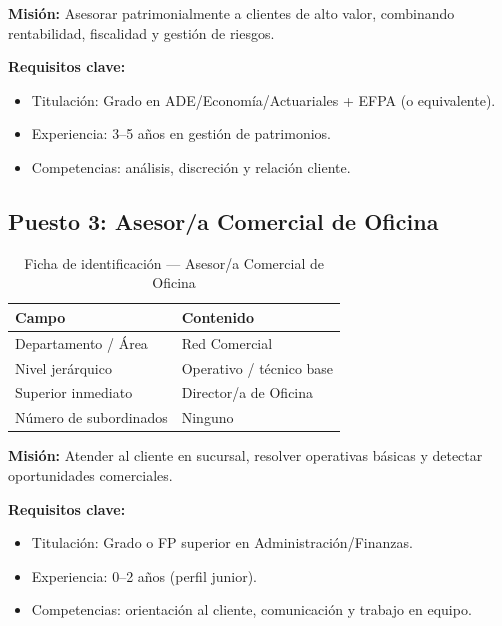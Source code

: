 \textbf{Misión:} Asesorar patrimonialmente a clientes de alto valor, combinando rentabilidad, fiscalidad y gestión de riesgos.

\textbf{Requisitos clave:}
\begin{itemize}
  \item Titulación: Grado en ADE/Economía/Actuariales + EFPA (o equivalente).
  \item Experiencia: 3–5 años en gestión de patrimonios.
  \item Competencias: análisis, discreción y relación cliente.
\end{itemize}


\subsection{Puesto 3: Asesor/a Comercial de Oficina}

\begin{table}[H]
  \centering
  \small
  \caption{Ficha de identificación — Asesor/a Comercial de Oficina}
  \begin{tabularx}{\textwidth}{lX}
    \toprule
    \textbf{Campo}                & \textbf{Contenido} \\
    \midrule
    Departamento / Área           & Red Comercial \\
    Nivel jerárquico              & Operativo / técnico base \\
    Superior inmediato            & Director/a de Oficina \\
    Número de subordinados        & Ninguno \\
    \bottomrule
  \end{tabularx}
\end{table}

\textbf{Misión:} Atender al cliente en sucursal, resolver operativas básicas y detectar oportunidades comerciales.

\textbf{Requisitos clave:}
\begin{itemize}
  \item Titulación: Grado o FP superior en Administración/Finanzas.
  \item Experiencia: 0–2 años (perfil junior).
  \item Competencias: orientación al cliente, comunicación y trabajo en equipo.
\end{itemize}



